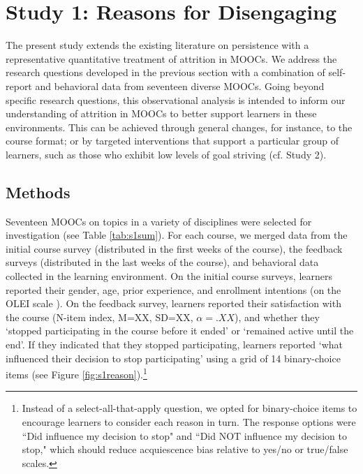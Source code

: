 \documentclass{sigchi}\usepackage[]{graphicx}\usepackage[]{color}
\begin{document}
\section{Study 1: Reasons for Disengaging}

The present study extends the existing literature on persistence with a representative quantitative treatment of attrition in MOOCs. We address the research questions developed in the previous section with a combination of self-report and behavioral data from seventeen diverse MOOCs. Going beyond specific research questions, this observational analysis is intended to inform our understanding of attrition in MOOCs to better support learners in these environments. This can be achieved through general changes, for instance, to the course format; or by targeted interventions that support a particular group of learners, such as those who exhibit low levels of goal striving (cf. Study 2).

\subsection{Methods}

Seventeen MOOCs on topics in a variety of disciplines were selected for investigation (see Table \ref{tab:s1sum}). For each course, we merged data from the initial course survey (distributed in the first weeks of the course), the feedback surveys (distributed in the last weeks of the course), and behavioral data collected in the learning environment. 
On the initial course surveys, learners reported their gender, age, prior experience, and enrollment intentions (on the OLEI scale \cite{kizilcec2015motivation}). On the feedback survey, learners reported their satisfaction with the course (N-item index, M=XX, SD=XX, $\alpha=.XX$), and whether they `stopped participating in the course before it ended' or `remained active until the end'. If they indicated that they stopped participating, learners reported `what influenced their decision to stop participating' using a grid of 14 binary-choice items (see Figure \ref{fig:s1reason}).\footnote{Instead of a select-all-that-apply question, we opted for binary-choice items to encourage learners to consider each reason in turn. The response options were ``Did influence my decision to stop" and ``Did NOT influence my decision to stop," which should reduce acquiescence bias relative to yes/no or true/false scales.}
\end{document}
